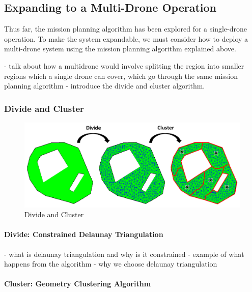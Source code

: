 \subsection{Expanding to a Multi-Drone Operation}
\label{sec:msp_multi_drone}

Thus far, the mission planning algorithm has been explored for a single-drone operation. To make the system expandable, we must consider how to deploy a multi-drone system using the mission planning algorithm explained above. 

- talk about how a multidrone would involve splitting the region into smaller regions which a single drone can cover, which go through the same mission planning algorithm
- introduce the divide and cluster algorithm. 

\subsubsection{Divide and Cluster}

\begin{figure}[h]
    \centering
    \includegraphics[width=\linewidth]{figs/Jihwan/Divide and Cluster.png}
    \caption[Divide and Cluster]
    {Divide and Cluster}
    \label{fig:msp_divide_cluster}
\end{figure}

\paragraph{Divide: Constrained Delaunay Triangulation}

- what is delaunay triangulation and why is it constrained
- example of what happens from the algorithm
- why we choose delaunay triangulation

\paragraph{Cluster: Geometry Clustering Algorithm}

